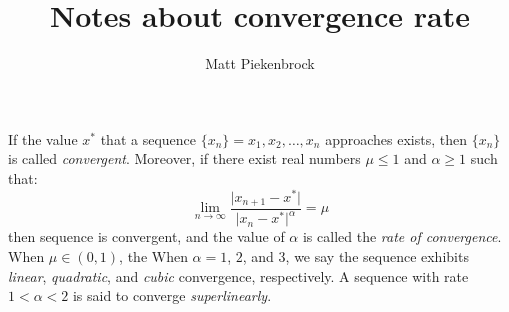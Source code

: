 \documentclass[10pt]{article}
\title{\vspace{-2.0em} Notes about convergence rate\vspace{-0.5em}}
\author{Matt Piekenbrock}
\date{}
\begin{document}
 \vspace{-2em} \maketitle \vspace{-2em}
\noindent If the value $x^\ast$ that a sequence $\{x_n\} = x_1, x_2, \dots, x_n$ approaches exists, then $\{x_n\}$ is called \emph{convergent}. Moreover, if there exist real numbers $\mu \leq 1$ and $\alpha \geq 1$ such that:
$$ \lim_{n \to \infty} \frac{ \lvert x_{n+1} - x^\ast \rvert }{ \lvert x_n - x^\ast \rvert^\alpha } = \mu $$
then sequence is convergent, and the value of $\alpha$ is called the \emph{rate of convergence}. 
When $\mu \in (0,1)$, the
When $\alpha = 1$, $2$, and $3$, we say the sequence exhibits \emph{linear}, \emph{quadratic}, and \emph{cubic} convergence, respectively. 
A sequence with rate $1 < \alpha < 2$ is said to converge \emph{superlinearly}.



\end{document}
